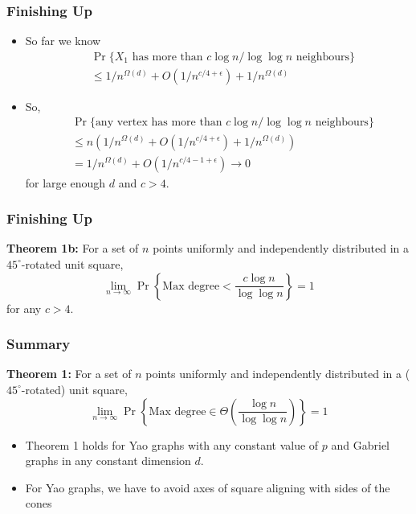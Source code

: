 \documentclass{beamer}
\begin{document}
\frame
{
  \frametitle{Finishing Up}

   \begin{itemize}
     \item So far we know
       \[
         \begin{aligned}
          &\Pr\{\mbox{$X_1$ has more than $c\log n/\log\log n$ neighbours}\} \\
          & \le 1/n^{\Omega(d)} + O(1/n^{c/4+\epsilon}) + 1/n^{\Omega(d)}  
         \end{aligned}
       \]
     \item So,
       \[
         \begin{aligned}
          &\Pr\{\mbox{any vertex has more than $c\log n/\log\log n$ neighbours}\} \\
          & \le n(1/n^{\Omega(d)} + O(1/n^{c/4+\epsilon}) + 1/n^{\Omega(d)}) \\
          & = 1/n^{\Omega(d)} + O(1/n^{c/4-1+\epsilon}) \rightarrow 0
         \end{aligned}
       \]
      for large enough $d$ and $c>4$.
   \end{itemize}
}

\frame
{
  \frametitle{Finishing Up}


       \textbf{Theorem 1b:}
           For a set of $n$ points uniformly and independently distributed
		in a $45^\circ$-rotated unit square, 
           \[\lim_{n\rightarrow\infty}
              \Pr\left\{\mbox{Max degree} < \frac{c\log
n}{\log\log n}\right\} = 1 \]
           for any $c > 4$.

}

\frame
{
  \frametitle{Summary}

    \textbf{Theorem 1:}
     For a set of $n$ points uniformly and independently distributed
		in a ($45^\circ$-rotated) unit square, 
     \[\lim_{n\rightarrow\infty}
         \Pr\left\{\mbox{Max degree} 
           \in \Theta\left(\frac{\log n}{\log\log n}\right)\right\} = 1 
     \]

    \begin{itemize}
      \item Theorem 1 holds for Yao graphs with any constant value of $p$
         and Gabriel graphs in any constant dimension $d$.
      \item For Yao graphs, we have to avoid axes of square aligning with
	sides of the cones
    \end{itemize}


}
\end{document}
